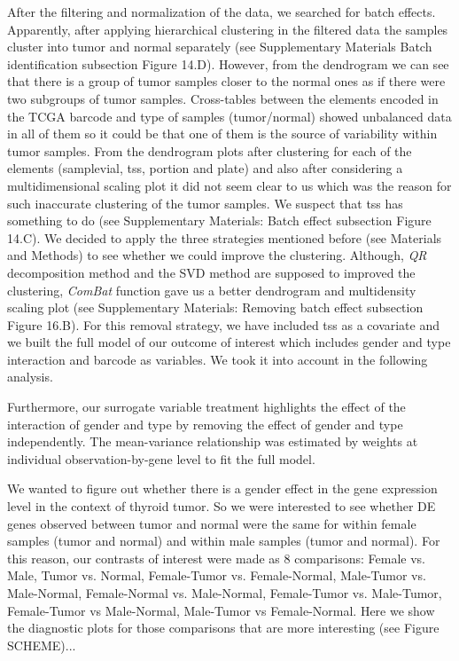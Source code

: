 \documentclass[9pt,twocolumn,twoside]{gsajnl}
\begin{document}
After the filtering and normalization of the data, we searched for batch effects. Apparently, after applying hierarchical clustering in the filtered data the samples cluster into tumor and normal separately (see Supplementary Materials Batch identification subsection Figure 14.D). However, from the dendrogram we can see that there is a group of tumor samples closer to the normal ones as if there were two subgroups of tumor samples. Cross-tables between the elements encoded in the TCGA barcode and type of samples (tumor/normal) showed unbalanced data in all of them so it could be that one of them is the source of variability within tumor samples. From the dendrogram plots after clustering for each of the elements (samplevial, tss, portion and plate) and also after considering a multidimensional scaling plot it did not seem clear to us which was the reason for such inaccurate clustering of the tumor samples. We suspect that tss has something to do (see Supplementary Materials: Batch effect subsection Figure 14.C). We decided to apply the three strategies mentioned before (see Materials and Methods) to see whether we could improve the clustering. Although, \textit{QR} decomposition method and the SVD method are supposed to improved the clustering, \textit{ComBat} function gave us a better dendrogram and multidensity scaling plot (see Supplementary Materials: Removing batch effect subsection Figure 16.B). For this removal strategy, we have included tss as a covariate and we built the full model of our outcome of interest which includes gender and type interaction and barcode as variables. We took it into account in the following analysis.

Furthermore, our surrogate variable treatment highlights the effect of the interaction of gender and type by removing the effect of gender and type independently. The mean-variance relationship was estimated by weights at individual observation-by-gene level to fit the full model.  

We wanted to figure out whether there is a gender effect in the gene expression level in the context of thyroid tumor. So we were interested to see whether DE genes observed between tumor and normal were the same for within female samples (tumor  and normal) and within male samples (tumor and normal). For this reason, our contrasts of interest were made as 8 comparisons: 
Female vs. Male, Tumor vs. Normal, Female-Tumor vs. Female-Normal,  Male-Tumor vs. Male-Normal, Female-Normal vs. Male-Normal, Female-Tumor vs. Male-Tumor, Female-Tumor vs Male-Normal, Male-Tumor vs Female-Normal. Here we show the diagnostic plots for those comparisons that are more interesting (see Figure SCHEME)...
\end{document}
